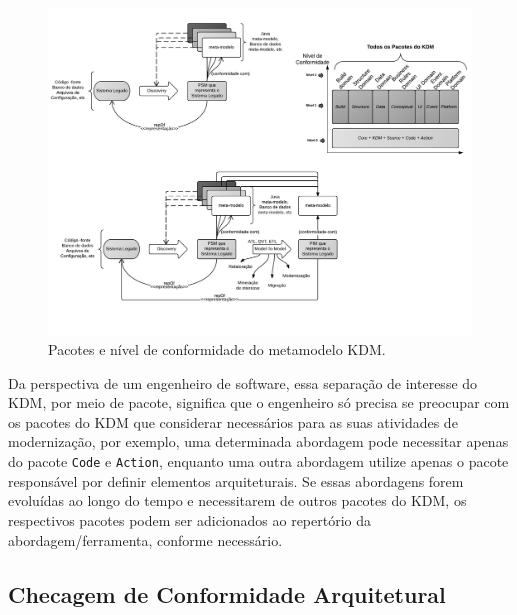 \documentclass[12pt]{article}
\begin{document}
\begin{figure}[htb]
 \centering
 \includegraphics[scale=1]{kdmLevels_pacotes.pdf}
 \caption{Pacotes e nível de conformidade do metamodelo KDM.}
 \label{kdm:domain} 
\end{figure}

Da perspectiva de um engenheiro de software, essa separação de interesse do KDM, por meio de pacote, significa que o engenheiro só precisa se preocupar com os pacotes do KDM que considerar necessários para as suas atividades de modernização, por exemplo, uma determinada abordagem pode necessitar apenas do pacote \texttt{Code} e \texttt{Action}, enquanto uma outra abordagem utilize apenas o pacote responsável por definir elementos arquiteturais. Se essas abordagens forem evoluídas ao longo do tempo e necessitarem de outros pacotes do KDM, os respectivos pacotes podem ser adicionados ao repertório da abordagem/ferramenta, conforme necessário.

\subsection{Checagem de Conformidade Arquitetural}
\end{document}
